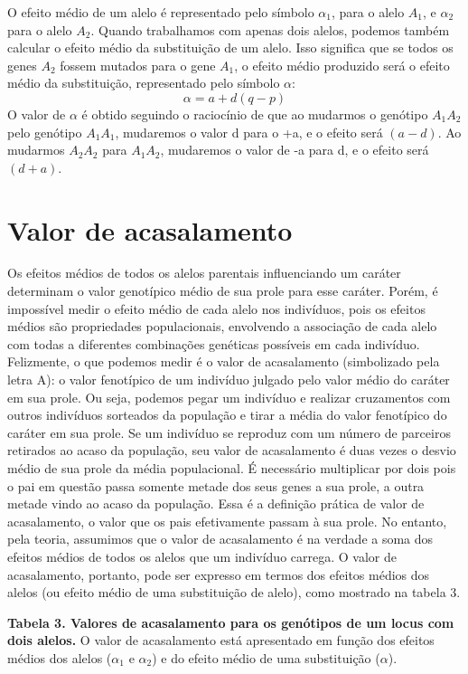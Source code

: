 \documentclass[portuges,]{tufte-handout}
\begin{document}
O efeito médio de um alelo é representado pelo símbolo \(\alpha_1\),
para o alelo \(A_1\), e \(\alpha_2\) para o alelo \(A_2\). Quando
trabalhamos com apenas dois alelos, podemos também calcular o efeito
médio da substituição de um alelo. Isso significa que se todos os genes
\(A_2\) fossem mutados para o gene \(A_1\), o efeito médio produzido
será o efeito médio da substituição, representado pelo símbolo
\(\alpha\): \[
\alpha = a + d(q-p)
\] O valor de \(\alpha\) é obtido seguindo o raciocínio de que ao
mudarmos o genótipo \(A_1A_2\) pelo genótipo \(A_1A_1\), mudaremos o
valor d para o +a, e o efeito será \((a - d)\). Ao mudarmos \(A_2A_2\)
para \(A_1A_2\), mudaremos o valor de -a para d, e o efeito será
\((d + a)\).

\section{Valor de acasalamento}\label{valor-de-acasalamento}

Os efeitos médios de todos os alelos parentais influenciando um caráter
determinam o valor genotípico médio de sua prole para esse caráter.
Porém, é impossível medir o efeito médio de cada alelo nos indivíduos,
pois os efeitos médios são propriedades populacionais, envolvendo a
associação de cada alelo com todas a diferentes combinações genéticas
possíveis em cada indivíduo. Felizmente, o que podemos medir é o valor
de acasalamento (simbolizado pela letra A): o valor fenotípico de um
indivíduo julgado pelo valor médio do caráter em sua prole. Ou seja,
podemos pegar um indivíduo e realizar cruzamentos com outros indivíduos
sorteados da população e tirar a média do valor fenotípico do caráter em
sua prole. Se um indivíduo se reproduz com um número de parceiros
retirados ao acaso da população, seu valor de acasalamento é duas vezes
o desvio médio de sua prole da média populacional. É necessário
multiplicar por dois pois o pai em questão passa somente metade dos seus
genes a sua prole, a outra metade vindo ao acaso da população. Essa é a
definição prática de valor de acasalamento, o valor que os pais
efetivamente passam à sua prole. No entanto, pela teoria, assumimos que
o valor de acasalamento é na verdade a soma dos efeitos médios de todos
os alelos que um indivíduo carrega. O valor de acasalamento, portanto,
pode ser expresso em termos dos efeitos médios dos alelos (ou efeito
médio de uma substituição de alelo), como mostrado na tabela 3.

\textbf{Tabela 3. Valores de acasalamento para os genótipos de um locus
com dois alelos.} O valor de acasalamento está apresentado em função dos
efeitos médios dos alelos (\(\alpha_1\) e \(\alpha_2\)) e do efeito
médio de uma substituição (\(\alpha\)).
\end{document}
